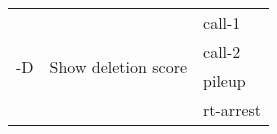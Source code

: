{\small
\begin{tabular}{@{}p{}p{}l@{}}
\multirow{4}{=}{-D} & \multirow{4}{=}{Show deletion score} & call-1 \\
 &  & call-2 \\
 &  & pileup \\
 &  & rt-arrest \\
\end{tabular}\\
}
